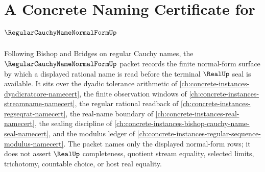 \chapter{A Concrete Naming Certificate for $\RegularCauchyNameNormalFormUp$}
\label{ch:concrete-instances-regular-cauchy-name-normal-form-namecert}

Following Bishop and Bridges on regular Cauchy names, the $\RegularCauchyNameNormalFormUp$ packet records the finite normal-form surface by which a displayed rational name is read before the terminal $\RealUp$ seal is available. It sits over the dyadic tolerance arithmetic of \autoref{ch:concrete-instances-dyadicratcore-namecert}, the finite observation windows of \autoref{ch:concrete-instances-streamname-namecert}, the regular rational readback of \autoref{ch:concrete-instances-regseqrat-namecert}, the real-name boundary of \autoref{ch:concrete-instances-real-namecert}, the sealing discipline of \autoref{ch:concrete-instances-bishop-cauchy-name-seal-namecert}, and the modulus ledger of \autoref{ch:concrete-instances-regular-sequence-modulus-namecert}. The packet names only the displayed normal-form rows; it does not assert $\RealUp$ completeness, quotient stream equality, selected limits, trichotomy, countable choice, or host real equality.

